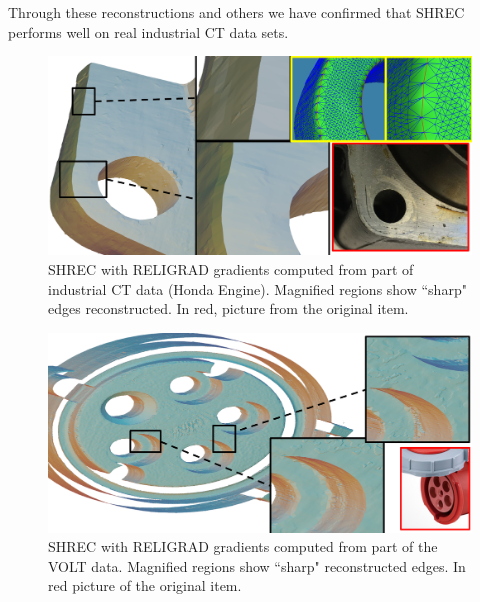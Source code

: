Through these reconstructions and others we have confirmed that SHREC performs well on real industrial CT data sets. 
\begin{figure}\centering
	\includegraphics[width=\linewidth]{images/ictsetA_2.eps}
	\caption{SHREC with RELIGRAD gradients computed from part of industrial CT data (Honda Engine). Magnified regions show ``sharp" edges reconstructed. In red, picture from the original item.}
	\label{fig:ict:hondaEng}
\end{figure}
\begin{figure}\centering
	\includegraphics[width=\linewidth]{images/volt.eps}
	\caption{SHREC with RELIGRAD gradients computed from part of the VOLT data. Magnified regions show ``sharp" reconstructed edges. In red picture of the original item.}
	\label{fig:ict:volt}
\end{figure}
